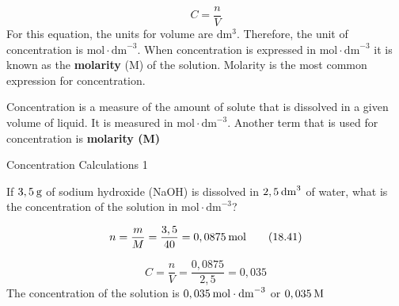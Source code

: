     \begin{equation}
    C=\frac{n}{V}\tag{18.40}
      \end{equation}
      \label{m38712*id282881}For this equation, the units for volume are $\mathrm{dm}{}^{3}$. Therefore, the unit of concentration is $\mathrm{mol}\ensuremath{\cdot}{\mathrm{dm}}^{-3}$.
When concentration is expressed in $\mathrm{mol}\ensuremath{\cdot}{\mathrm{dm}}^{-3}$ it is known as the \textbf{molarity} (M) of the solution. Molarity is the most common expression for concentration.\par 
\label{m38712*notfhsst!!!underscore!!!id1649}
	\par
\label{m38712*fhsst!!!underscore!!!id1650}
 { \label{m38712*meaningfhsst!!!underscore!!!id1650}
      \label{m38712*id282955}Concentration is a measure of the amount of solute that is dissolved in a given volume of liquid. It is measured in $\mathrm{mol}\ensuremath{\cdot}{\mathrm{dm}}^{-3}$. Another term that is used for concentration is \textbf{molarity (M)} \par 
       } 
\par
            \label{m38712*secfhsst!!!underscore!!!id1653}\vspace{.5cm} 
      \noindent
      \begin{wex}{ Concentration Calculations 1 }
{
      \label{m38712*probfhsst!!!underscore!!!id1654}
      \label{m38712*id283003}If $3,5\phantom{\rule{2pt}{0ex}}\mathrm{g}$ of sodium hydroxide (NaOH) is dissolved in $2,5\phantom{\rule{2pt}{0ex}}{\mathrm{dm}}^{3}$ of water, what is the concentration of the solution in $\mathrm{mol}\ensuremath{\cdot}{\mathrm{dm}}^{-3}$?\par 
      \vspace{5pt}}
{
      \label{m38712*id283067}\nopagebreak\noindent{}
    \begin{equation}
    n=\frac{m}{M}=\frac{3,5}{40}=0,0875\phantom{\rule{2pt}{0ex}}\mathrm{mol}\tag{18.41}
      \end{equation}
      \label{m38712*id283121}\nopagebreak\noindent{}
        
    \begin{equation}
    C=\frac{n}{V}=\frac{0,0875}{2,5}=0,035\tag{18.42}
      \end{equation}
      \label{m38712*id283169}The concentration of the solution is $0,035\phantom{\rule{2pt}{0ex}}\mathrm{mol}\ensuremath{\cdot}{\mathrm{dm}}^{-3}$ or $0,035\phantom{\rule{2pt}{0ex}}\mathrm{M}$
 \par 
}
    \end{wex}

